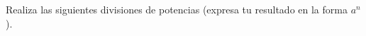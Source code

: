 \question[10] Realiza las siguientes divisiones de potencias (expresa tu resultado en la forma $a^n$).
\begin{multicols}{2}
\begin{parts}
    
    
    
    
    
    
    
    
    
    
    
\end{parts}
\end{multicols}